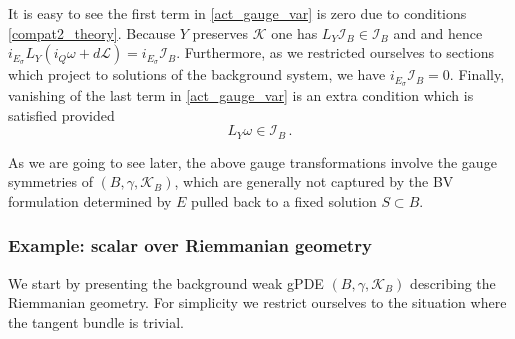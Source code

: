 \documentclass[a4paper,12pt]{article}
\numberwithin{equation}{section} %
\def\cI{\mathcal{I}}
\def\cK{\mathcal{K}}
\def\cL{\mathcal{L}}
\begin{document}
It is easy to see the first term in \eqref{act_gauge_var} is zero due to conditions \eqref{compat2_theory}. Because 
$Y$ preserves $\cK$ one has $L_Y \cI_B \in \cI_B$ and  and hence $i_{E_{\sigma}}L_Y(i_Q\omega + d\cL) = i_{E_{\sigma}}\cI_B$. Furthermore, as we restricted ourselves to sections which project to solutions of the background system, we have $i_{E_{\sigma}} \cI_B = 0$. Finally, vanishing of the last term in \eqref{act_gauge_var} is an extra condition which is satisfied provided 
\begin{equation} \label{background-symm-extracond}
    L_Y \omega \in \cI_B\,.
\end{equation}

As we are going to see later, the above gauge transformations involve the gauge symmetries of $(B,\gamma,\cK_B)$, which are generally not captured by the BV formulation determined by $E$ pulled back to a fixed solution $S\subset B$. 


\subsubsection{Example: scalar over  Riemmanian geometry}

We start by presenting the background weak gPDE $(B,\gamma, \cK_B)$  describing the Riemmanian geometry. For simplicity we restrict ourselves to the situation where the tangent bundle is trivial. 
\end{document}
